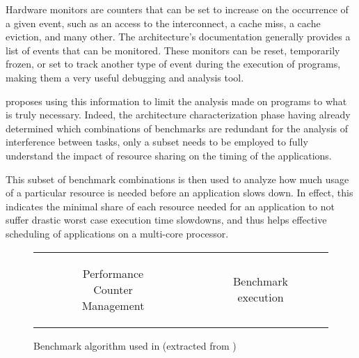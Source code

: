 Hardware monitors are counters that can be set to increase on the occurrence of
a given event, such as an access to the interconnect, a cache miss, a cache
eviction, and many other. The architecture's documentation generally provides a
list of events that can be monitored. These monitors can be reset, temporarily
frozen, or set to track another type of event during the execution of programs,
making them a very useful debugging and analysis tool.

\cite{Bin14} proposes using this information to limit the analysis made on
programs to what is truly necessary. Indeed, the architecture characterization
phase having already determined which combinations of benchmarks are redundant
for the analysis of interference between tasks, only a subset needs to be
employed to fully understand the impact of resource sharing on the
timing of the applications.

This subset of benchmark combinations is then used to analyze how much usage of
a particular resource is needed before an application slows down. In effect,
this indicates the minimal share of each resource needed for an application to
not suffer drastic worst case execution time slowdowns, and thus helps effective
scheduling of applications on a multi-core processor.

\begin{figure}[hbt!]
\begin{tabular}{cc}
\begin{subfigure}[t]{0.37\textwidth}

\caption{Performance Counter Management}
\label{fig:micro_bench:co_running_apps_cots_algo_part_one}
\end{subfigure}
&
\begin{subfigure}[t]{0.47\textwidth}

\caption{Benchmark execution}
\label{fig:micro_bench:co_running_apps_cots_algo_part_deux}
\end{subfigure}
\end{tabular}
\caption{%
Benchmark algorithm used in \cite{Bin14} (extracted from \cite{Bin14Thesis})
}
\label{fig:micro_bench:co_running_apps_cots_algo}
\end{figure}

